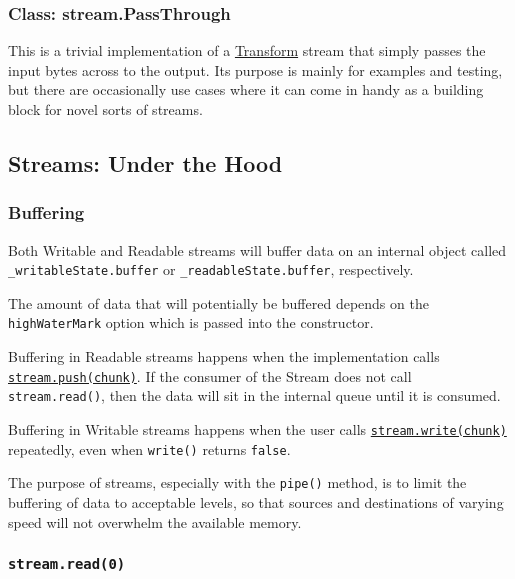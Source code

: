 \subsubsection{Class:
stream.PassThrough}\label{class-stream.passthrough}

This is a trivial implementation of a
\hyperref[streamux5fclassux5fstreamux5ftransform]{Transform} stream that
simply passes the input bytes across to the output. Its purpose is
mainly for examples and testing, but there are occasionally use cases
where it can come in handy as a building block for novel sorts of
streams.

\subsection{Streams: Under the Hood}\label{streams-under-the-hood}

\subsubsection{Buffering}\label{buffering}

Both Writable and Readable streams will buffer data on an internal
object called \texttt{\_writableState.buffer} or
\texttt{\_readableState.buffer}, respectively.

The amount of data that will potentially be buffered depends on the
\texttt{highWaterMark} option which is passed into the constructor.

Buffering in Readable streams happens when the implementation calls
\hyperref[streamux5freadableux5fpushux5fchunkux5fencoding]{\texttt{stream.push(chunk)}}.
If the consumer of the Stream does not call \texttt{stream.read()}, then
the data will sit in the internal queue until it is consumed.

Buffering in Writable streams happens when the user calls
\hyperref[streamux5fwritableux5fwriteux5fchunkux5fencodingux5fcallback]{\texttt{stream.write(chunk)}}
repeatedly, even when \texttt{write()} returns \texttt{false}.

The purpose of streams, especially with the \texttt{pipe()} method, is
to limit the buffering of data to acceptable levels, so that sources and
destinations of varying speed will not overwhelm the available memory.

\subsubsection{\texttt{stream.read(0)}}\label{stream.read0}

